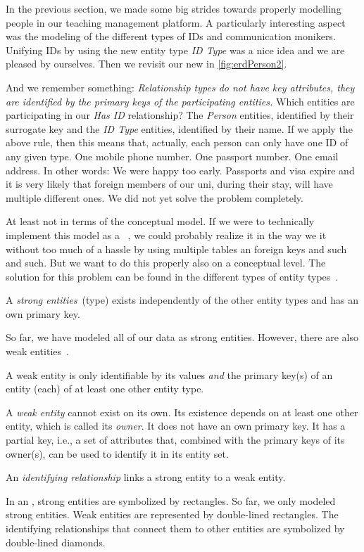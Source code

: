 %
%
%
In the previous section, we made some big strides towards properly modelling people in our teaching management platform.
A particularly interesting aspect was the modeling of the different types of IDs and communication monikers.
Unifying IDs by using the new entity type \emph{ID Type} was a nice idea and we are pleased by ourselves.
Then we revisit our new  in \cref{fig:erdPerson2}.

And we remember something:
\emph{Relationship types do not have key attributes, they are identified by the primary keys of the participating entities.}
Which entities are participating in our \emph{Has ID} relationship?
The \emph{Person} entities, identified by their surrogate key and the \emph{ID Type} entities, identified by their name.
If we apply the above rule, then this means that, actually, each person can only have one ID of any given type.
One mobile phone number.
One passport number.
One email address.
In other words:
We were happy too early.
Passports and visa expire and it is very likely that foreign members of our uni, during their stay, will have multiple different ones.
We did not yet solve the problem completely.

At least not in terms of the conceptual model.
If we were to technically implement this model as a \postgresql\ \db, we could probably realize it in the way we  it without too much of a hassle by using multiple tables an foreign keys and such and such.
But we want to do this properly also on a conceptual level.
The solution for this problem can be found in the different types of entity types~\cite{S2024D:CDMERDE}.%
%
\begin{definition}%
A \emph{strong entities}~(type) exists independently of the other entity types and has an own primary key.%
\end{definition}%
%
So far, we have modeled all of our data as strong entities.
However, there are also weak entities~\cite{P2006CITRD:CERDTRM,SS2005EIDDDFDB:CDDICAMP,S2024D:CDMERDE}.%
%
\begin{definition}%
A weak entity is only identifiable by its values \emph{and} the primary key(s) of an entity (each) of at least one other entity type.%
\end{definition}%
%
A \emph{weak entity} cannot exist on its own.
Its existence depends on at least one other entity, which is called its \emph{owner}.
It does not have an own primary key.
It has a partial key, i.e., a set of attributes that, combined with the primary keys of its owner(s), can be used to identify it in its entity set.%
%
\begin{definition}%
An \emph{identifying relationship} links a strong entity to a weak entity.%
\end{definition}%
%
In an , strong entities are symbolized by rectangles.
So far, we only modeled strong entities.
Weak entities are represented by double-lined rectangles.
The identifying relationships that connect them to other entities are symbolized by double-lined diamonds.

